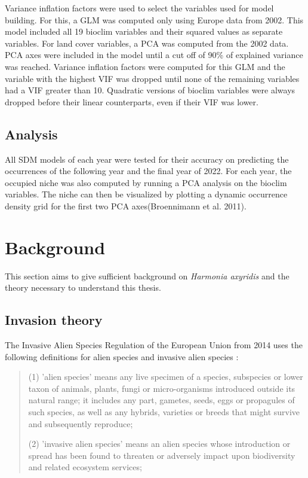 \documentclass[12pt,a4paper]{article}
\begin{document}
Variance inflation factors were used to select the variables used for model building. 
For this, a GLM was computed only using Europe data from 2002.
This model included all 19 bioclim variables and their squared values as separate variables.
For land cover variables, a PCA was computed from the 2002 data.
PCA axes were included in the model until a cut off of 90\% of explained variance was reached.
Variance inflation factors were computed for this GLM and the variable with the highest VIF was dropped until none of the remaining variables had a VIF greater than 10. Quadratic versions of bioclim variables were always dropped before their linear counterparts, even if their VIF was lower.

\subsection{Analysis}
All SDM models of each year were tested for their accuracy on predicting the occurrences of the following year and the final year of 2022. 
For each year, the occupied niche was also computed by running a PCA analysis on the bioclim variables. The niche can then be visualized by plotting a dynamic occurrence density grid for the first two PCA axes(Broennimann et al. 2011).

\newpage
\section{Background}
This section aims to give sufficient background on \textit{Harmonia axyridis} and the theory necessary to understand this thesis.

\subsection{Invasion theory}
The Invasive Alien Species Regulation of the European Union from 2014 uses the following definitions for alien species and invasive alien species \cite{EU2014LexIAS}:
\begin{quote}
    (1) 'alien species' means any live specimen of a species, subspecies or lower taxon of animals, plants, fungi or micro-organisms introduced outside its natural range; it includes any part, gametes, seeds, eggs or propagules of such species, as well as any hybrids, varieties or breeds that might survive and subsequently reproduce;

    (2) 'invasive alien species' means an alien species whose introduction or spread has been found to threaten or adversely impact upon biodiversity and related ecosystem services;
\end{quote}
\end{document}
